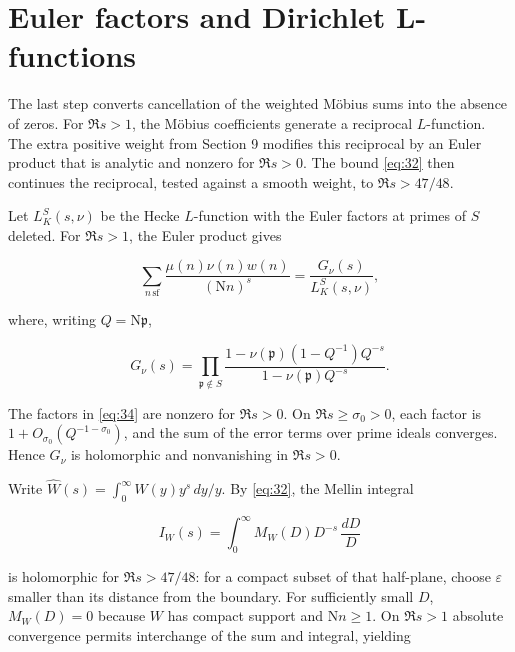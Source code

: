 \documentclass[reqno,a4paper,11pt]{amsart}
\begin{document}
\section{Euler factors and Dirichlet L-functions}

The last step converts cancellation of the weighted Möbius sums into the absence of zeros. For $\Re s>1$, the Möbius coefficients generate a reciprocal $L$-function. The extra positive weight from Section 9 modifies this reciprocal by an Euler product that is analytic and nonzero for $\Re s>0$. The bound \eqref{eq:32} then continues the reciprocal, tested against a smooth weight, to $\Re s>47/48$.

Let ${L}_{K}^{S}\left( s,\nu \right) $ be the Hecke $L$-function with the Euler factors at primes of $S$ deleted. For $\Re s>1$, the Euler product gives

\begin{equation}\label{eq:33}
\sum _{n\,\mathrm{sf}} \frac{\mu \left( n\right) \nu \left( n\right) w\left( n\right) }{{\left( \mathrm{N}n\right) }^{s}}=\frac{{G}_{\nu }\left( s\right) }{{L}_{K}^{S}\left( s,\nu \right) },
\end{equation}

where, writing $Q=\mathrm{N}\mathfrak{p}$,

\begin{equation}\label{eq:34}
{G}_{\nu }\left( s\right) =\prod _{\mathfrak{p}\notin S} \frac{1-\nu \left( \mathfrak{p}\right) \left( 1-{Q}^{-1}\right) {Q}^{-s}}{1-\nu \left( \mathfrak{p}\right) {Q}^{-s}}.
\end{equation}

The factors in \eqref{eq:34} are nonzero for $\Re s>0$. On $\Re s\ge {\sigma }_{0}>0$, each factor is $1+{O}_{{\sigma }_{0}}\left( {Q}^{-1-{\sigma }_{0}}\right) $, and the sum of the error terms over prime ideals converges. Hence ${G}_{\nu }$ is holomorphic and nonvanishing in $\Re s>0$.

Write $\widehat{W}\left( s\right) =\int _{0}^{\infty } W\left( y\right) {y}^{s}\,dy/y$. By \eqref{eq:32}, the Mellin integral

\begin{equation}\label{eq:35}
{I}_{W}\left( s\right) =\int _{0}^{\infty } {M}_{W}\left( D\right) {D}^{-s}\,\frac{dD}{D}
\end{equation}

is holomorphic for $\Re s>47/48$: for a compact subset of that half-plane, choose $\varepsilon $ smaller than its distance from the boundary. For sufficiently small $D$, ${M}_{W}\left( D\right) =0$ because $W$ has compact support and $\mathrm{N}n\ge 1$. On $\Re s>1$ absolute convergence permits interchange of the sum and integral, yielding
\end{document}
